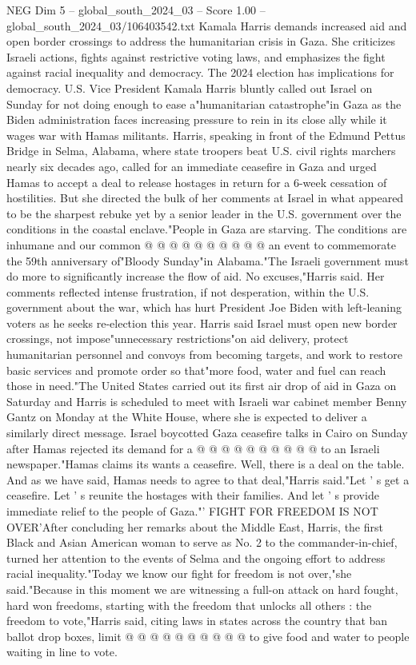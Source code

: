 \begin{textsample}{NEG Dim 5 – global\_south\_2024\_03 – Score 1.00 – global\_south\_2024\_03/106403542.txt}  \label{ex:f5_neg_208}
Kamala Harris demands increased aid and open border crossings to address the humanitarian crisis in Gaza.
She criticizes Israeli actions, fights against restrictive voting laws, and emphasizes the fight against racial inequality and democracy.
The 2024 election has implications for democracy.
U.S.
Vice President Kamala Harris bluntly called out Israel on Sunday for not doing enough to ease a"humanitarian catastrophe"in Gaza as the Biden administration faces increasing pressure to rein in its close ally while it wages war with Hamas militants.
Harris, speaking in front of the Edmund Pettus Bridge in Selma, Alabama, where state troopers beat U.S. civil rights marchers nearly six decades ago, called for an immediate ceasefire in Gaza and urged Hamas to accept a deal to release hostages in return for a 6-week cessation of hostilities.
But she directed the bulk of her comments at Israel in what appeared to be the sharpest rebuke yet by a senior leader in the U.S. government over the conditions in the coastal enclave."People in Gaza are starving.
The conditions are inhumane and our common @ @ @ @ @ @ @ @ @ @ an event to commemorate the 59th anniversary of"Bloody Sunday"in Alabama."The Israeli government must do more to significantly increase the flow of aid.
No excuses,"Harris said.
Her comments reflected intense frustration, if not desperation, within the U.S. government about the war, which has hurt President Joe Biden with left-leaning voters as he seeks re-election this year.
Harris said Israel must open new border crossings, not impose"unnecessary restrictions"on aid delivery, protect humanitarian personnel and convoys from becoming targets, and work to restore basic services and promote order so that"more food, water and fuel can reach those in need."The United States carried out its first air drop of aid in Gaza on Saturday and Harris is scheduled to meet with Israeli war cabinet member Benny Gantz on Monday at the White House, where she is expected to deliver a similarly direct message.
Israel boycotted Gaza ceasefire talks in Cairo on Sunday after Hamas rejected its demand for a @ @ @ @ @ @ @ @ @ @ to an Israeli newspaper."Hamas claims its wants a ceasefire.
Well, there is a deal on the table.
And as we have said, Hamas needs to agree to that deal,"Harris said."Let ' s get a ceasefire.
Let ' s reunite the hostages with their families.
And let ' s provide immediate relief to the people of Gaza."' FIGHT FOR FREEDOM IS NOT OVER'After concluding her remarks about the Middle East, Harris, the first Black and Asian American woman to serve as No. 2 to the commander-in-chief, turned her attention to the events of Selma and the ongoing effort to address racial inequality."Today we know our fight for freedom is not over,"she said."Because in this moment we are witnessing a full-on attack on hard fought, hard won freedoms, starting with the freedom that unlocks all others : the freedom to vote,"Harris said, citing laws in states across the country that ban ballot drop boxes, limit @ @ @ @ @ @ @ @ @ @ to give food and water to people waiting in line to vote.

\end{textsample}
